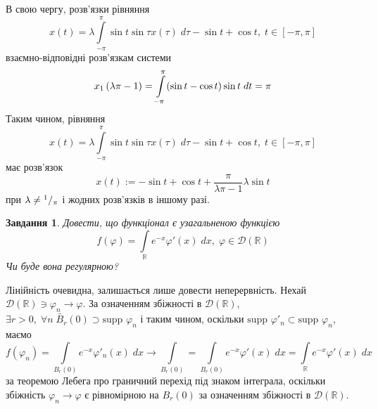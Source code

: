 \documentclass[12pt]{article} %
\newtheorem{prob}{Завдання}
\newcommand{\dt}{\;dt}
\newcommand{\dx}{\;dx}
\let\oldint\int
\renewcommand{\int}{\oldint\limits}
\let\phi\varphi
\begin{document}
	В свою чергу, розв’язки рівняння
	\[x(t)=\lambda\int_{-\pi}^{\pi}\sin t\sin\tau x(\tau)\;d\tau-\sin t+\cos t,\;t\in[-\pi,\pi]\]
	взаємно-відповідні розв’язкам системи
	\[x_1\mybra{{\lambda}{\pi}-1}=\int_{-\pi}^\pi(\sin t-\cos t)\sin t\dt=\pi\]
	Таким чином, рівняння
	\[x(t)=\lambda\int_{-\pi}^{\pi}\sin t\sin\tau x(\tau)\;d\tau-\sin t+\cos t,\;t\in[-\pi,\pi]\]
	має розв’язок \[x(t):=-\sin t+\cos t+\frac{\pi}{\lambda\pi-1}\lambda\sin t\]
	при $\lambda\neq{^{1}/_{\pi}}$ і жодних розв’язків в іншому разі.
\begin{prob}
	Довести, що функціонал є узагальненою функцією	\[f(\phi)=\int_{\mathbb{R}}e^{-x}\phi'(x)\dx,\;\phi\in\mathcal{D}(\mathbb{R})\]
	Чи буде вона регулярною?
\end{prob}
\newcommand{\supp}{\mbox{supp }}
Лінійність очевидна, залишається лише довести неперервність. Нехай $\mathcal{D}(\mathbb{R})\ni\phi_n\to\phi$. За означенням
збіжності в $\mathcal{D}(\mathbb{R})$, $\exists r>0,\;
\forall n\;\widetilde{B_r}(0)\supset\supp\phi_n$ і таким чином, оскільки $\supp\phi'_n\subset\supp\phi_n$, маємо
\[f(\phi_n)=\int_{B_r(0)}e^{-x}\phi'_n(x)\dx\to\int_{B_r(0)}=\int_{B_r(0)}e^{-x}\phi'(x)\dx=\int_{\mathbb{R}}e^{-x}\phi'(x)\dx\]
за теоремою Лебега про граничний перехід під знаком інтеграла,
оскільки збіжність $\phi_n\to\phi$ є рівномірною на $B_r(0)$ за означенням збіжності в $\mathcal{D}(\mathbb{R})$.
\end{document}
